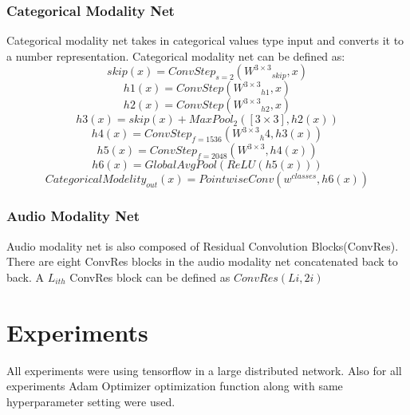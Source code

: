\documentclass[12pt]{article}
\begin{document}
\subsubsection{Categorical Modality Net}
Categorical modality net takes in categorical values type input and converts it to a number representation. Categorical modality net can be defined as:
\begin{equation}
skip(x) = ConvStep_{s=2}({W^{3 \times 3}}_{skip},x)
\end{equation}
\begin{equation}
h1(x) = ConvStep({W^{3 \times 3}}_{h1},x)
\end{equation}
\begin{equation}
h2(x) = ConvStep({W^{3 \times 3}}_{h2},x)
\end{equation}
\begin{equation}
h3(x) = skip(x)+MaxPool_{2}([3 \times 3],h2(x))
\end{equation}
\begin{equation}
h4(x) = ConvStep_{f=1536}({W^{3 \times 3}}_h4, h3(x))
\end{equation}
\begin{equation}
h5(x) = ConvStep_{f=2048}(W^{3 \times 3},h4(x))
\end{equation}
\begin{equation}
h6(x) = GlobalAvgPool(ReLU(h5(x)))
\end{equation}
\begin{equation}
CategoricalModelity_{out}(x) = PointwiseConv(w^{classes},h6(x))
\end{equation}
\subsubsection{Audio Modality Net}
Audio modality net is also composed of Residual Convolution Blocks(ConvRes). There are eight ConvRes blocks in the audio modality net concatenated back to back. A $L_{ith}$ ConvRes block can be defined as $ConvRes(Li,2i)$
\section{Experiments}
All experiments were using tensorflow in a large distributed network. Also for all experiments Adam Optimizer optimization function along with same hyperparameter setting were used.
\end{document}
